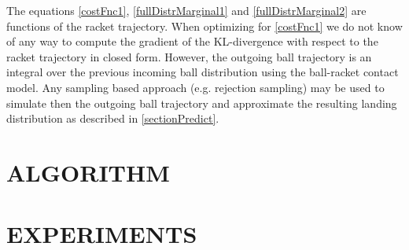 \documentclass[letterpaper, 10 pt, conference]{ieeeconf}
\begin{document}
%
%
%

The equations \eqref{costFnc1}, \eqref{fullDistrMarginal1} and \eqref{fullDistrMarginal2} are functions of the racket trajectory. When optimizing for \eqref{costFnc1} we do not know of any way to compute the gradient of the KL-divergence with respect to the racket trajectory in closed form. However, the outgoing ball trajectory is an integral over the previous incoming ball distribution using the ball-racket contact model. Any sampling based approach (e.g. rejection sampling) may be used to simulate then the outgoing ball trajectory and approximate the resulting landing distribution as described in \ref{sectionPredict}.


\section{ALGORITHM}\label{alg}

\section{EXPERIMENTS}\label{results}

\end{document}
